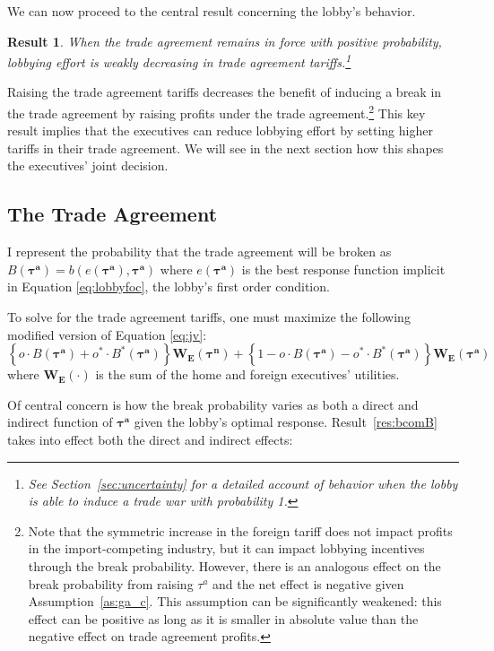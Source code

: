 \documentclass[10pt]{article}
\newtheorem{result}{Result}
\newcommand{\bta}{\bm{\tau^a}}
\newcommand{\btn}{\bm{\tau^n}}
\begin{document}
We can now proceed to the central result concerning the lobby's behavior. 
\begin{result}
  When the trade agreement remains in force with positive probability, lobbying effort is weakly decreasing in trade agreement tariffs.\footnote{See Section~\ref{sec:uncertainty} for a detailed account of behavior when the lobby is able to induce a trade war with probability 1.}
  \label{res:lobby}
\end{result}

\noindent Raising the trade agreement tariffs decreases the benefit of inducing a break in the trade agreement by raising profits under the trade agreement.\footnote{Note that the symmetric increase in the foreign tariff does not impact profits in the import-competing industry, but it can impact lobbying incentives through the break probability. However, there is an analogous effect on the break probability from raising $\tau^a$ and the net effect is negative given Assumption~\ref{as:ga_c}. This assumption can be significantly weakened: this effect can be positive as long as it is smaller in absolute value than the negative effect on trade agreement profits.} This key result implies that the executives can reduce lobbying effort by setting higher tariffs in their trade agreement. We will see in the next section how this shapes the executives' joint decision. 


\subsection{The Trade Agreement}
\label{sec:ta}
I represent the probability that the trade agreement will be broken as $B(\bta)=b(e(\bta),\bta)$ where $e(\bta)$ is the best response function implicit in Equation \ref{eq:lobbyfoc}, the lobby's first order condition.

To solve for the trade agreement tariffs, one must maximize the following modified version of Equation \ref{eq:jv}:
\begin{equation}
    \left\{ o \cdot B(\bta) + o^* \cdot B^*(\bta) \right\} \bm{W_E}(\btn) + \left\{ 1- o \cdot B(\bta) - o^* \cdot B^*(\bta) \right\} \bm{W_E}(\bta)  
  \label{eq:jv2}
\end{equation}
where $\bm{W_E}(\cdot)$ is the sum of the home and foreign executives' utilities.

Of central concern is how the break probability varies as both a direct and indirect function of $\bta$ given the lobby's optimal response. Result~\ref{res:bcomB} takes into effect both the direct and indirect effects:
\end{document}
